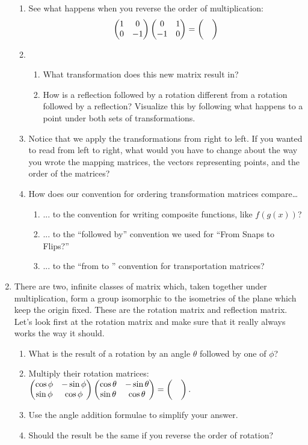 \documentclass[../gatm_answers.tex]{subfiles}
\begin{document}
\begin{enumerate}
\begin{enumerate}
\item See what happens when you reverse the order of multiplication: \label{prob:cm_fill_in_blank_end}
$$\begin{pmatrix} 1 & 0 \\ 0 & -1 \end{pmatrix}\begin{pmatrix} 0 & 1 \\ -1 & 0 \end{pmatrix}=\begin{pmatrix}  &  \\  &  \end{pmatrix}$$
\item \begin{enumerate}
\item What transformation does this new matrix result in?
\item How is a reflection followed by a rotation different from a rotation followed by a reflection? Visualize this by following what happens to a point under both sets of transformations.
\end{enumerate}
\item Notice that we apply the transformations from right to left. If you wanted to read from left to right, what would you have to change about the way you wrote the mapping matrices, the vectors representing points, and the order of the matrices?
\item How does our convention for ordering transformation matrices compare…
\begin{enumerate}
\item ... to the convention for writing composite functions, like $f(g(x))$?
\item ... to the ``followed by'' convention we used for ``From Snaps to Flips?''
\item ... to the ``from \underline{\phantom{0}} to \underline{\phantom{0}}'' convention for transportation matrices?
\end{enumerate}
\end{enumerate}
\item There are two, infinite classes of matrix which, taken together under multiplication, form a group isomorphic to the isometries of the plane which keep the origin fixed. These are the rotation matrix and reflection matrix. Let's look first at the rotation matrix and make sure that it really always works the way it should.
\begin{enumerate}
\item What is the result of a rotation by an angle $\theta$ followed by one of $\phi$?
\item Multiply their rotation matrices: $\begin{pmatrix} \cos \phi & -\sin \phi \\ \sin\phi & \cos\phi \end{pmatrix} \begin{pmatrix} \cos \theta & -\sin \theta \\ \sin\theta & \cos\theta \end{pmatrix}=\begin{pmatrix}  &  \\  &  \end{pmatrix}.$
\item Use the angle addition formulae to simplify your answer.
\item Should the result be the same if you reverse the order of rotation?

\end{enumerate}
\end{enumerate}
\end{document}
